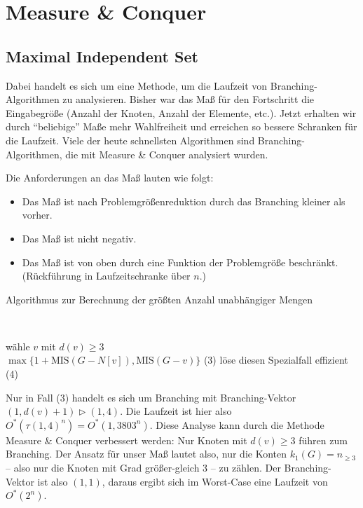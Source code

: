 \chapter{Measure \& Conquer}

\section{Maximal Independent Set}
  Dabei handelt es sich um eine Methode, um die Laufzeit von Branching-Algorithmen zu analysieren. Bisher war das Maß für den Fortschritt die Eingabegröße (Anzahl der Knoten, Anzahl der Elemente, etc.). Jetzt erhalten wir durch ``beliebige'' Maße mehr Wahlfreiheit und erreichen so bessere Schranken für die Laufzeit. Viele der heute schnellsten Algorithmen sind Branching-Algorithmen, die mit Measure \& Conquer analysiert wurden. 
  
  Die Anforderungen an das Maß lauten wie folgt:
  \begin{itemize}
   \item Das Maß ist nach Problemgrößenreduktion durch das Branching kleiner als vorher.
   \item Das Maß ist nicht negativ.
   \item Das Maß ist von oben durch eine Funktion der Problemgröße beschränkt. (Rückführung in Laufzeitschranke über $n$.)
  \end{itemize}

  

  \begin{algorithm}[H]
    \caption{Algorithmus zur Berechnung der größten Anzahl unabhängiger Mengen}
  
     \\

     {
      wähle \(v\) mit \(d(v) \geq 3\) \\
      \Return \(\max \{ 1 + \text{MIS}(G - N[v]), \text{MIS}(G-v) \}\) (3)
    } {
      löse diesen Spezialfall effizient (4)
    }
  \end{algorithm}

  Nur in Fall (3) handelt es sich um Branching mit Branching-Vektor $(1,d(v) +1) \vartriangleright (1,4)$. Die Laufzeit ist hier also $O^*(\tau(1,4)^n) = O^*(1{,}3803^n)$. Diese Analyse kann durch die Methode Measure \& Conquer verbessert werden: Nur Knoten mit $d(v) \geq 3$ führen zum Branching. Der Ansatz für unser Maß lautet also, nur die Konten $k_1(G) = n_{\geq 3}$ -- also nur die Knoten mit Grad größer-gleich 3 -- zu zählen. Der Branching-Vektor ist also $(1,1)$, daraus ergibt sich im Worst-Case eine Laufzeit von $O^*(2^n)$. 
  
